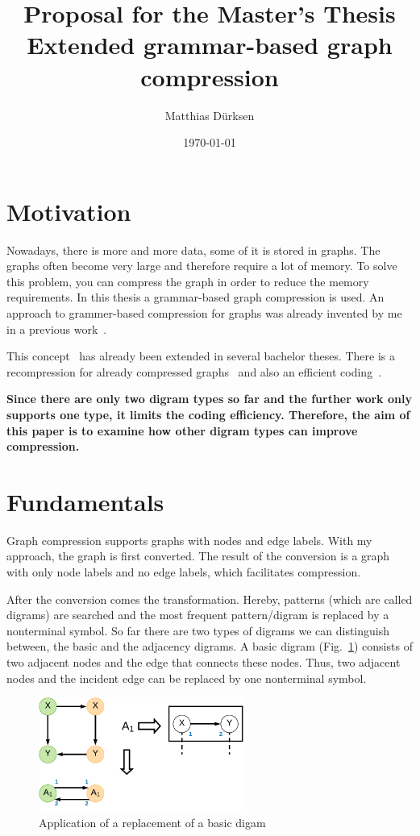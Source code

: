 \documentclass[a4paper]{scrartcl}
\title{Proposal for the Master's Thesis\\Extended grammar-based graph compression}
\author{Matthias Dürksen}
\date{\today}
\newcommand{\asd}[1]{\textbf{#1}}
\begin{document}
\maketitle

\section{Motivation}\label{sec:motivation}

Nowadays, there is more and more data, some of it is stored in graphs. The graphs often become very large and therefore require a lot of memory. To solve this problem, you can compress the graph in order to reduce the memory requirements. In this thesis a grammar-based graph compression is used. An approach to grammer-based compression for graphs was already invented by me in a previous work~\cite{mattdk}.

This concept~\cite{mattdk} has already been extended in several bachelor theses. There is a recompression for already compressed graphs~\cite{werneke} and also an efficient coding~\cite{georgi}. 

\asd{
Since there are only two digram types so far and the further work only supports one type, it limits the coding efficiency. Therefore, the aim of this paper is to examine how other digram types can improve compression.}

\section{Fundamentals}


Graph compression supports graphs with nodes and edge labels. With my approach, the graph is first converted. The result of the conversion is a graph with only node labels and no edge labels, which facilitates compression. 

After the conversion comes the transformation. Hereby, patterns (which are called digrams) are searched and the most frequent pattern/digram is replaced by a nonterminal symbol.
So far there are two types of digrams we can distinguish between, the basic and the adjacency digrams.
A basic digram (Fig.~\ref{fig:basicDigram}) consists of two adjacent nodes and the edge that connects these nodes. Thus, two adjacent nodes and the incident edge can be replaced by one nonterminal symbol.
\begin{figure}[h]
	\centering
	\includegraphics[width=0.6\textwidth]{img/basicDigram}
	\caption{Application of a replacement of a basic digam}
	\label{fig:basicDigram}
\end{figure}
\end{document}
